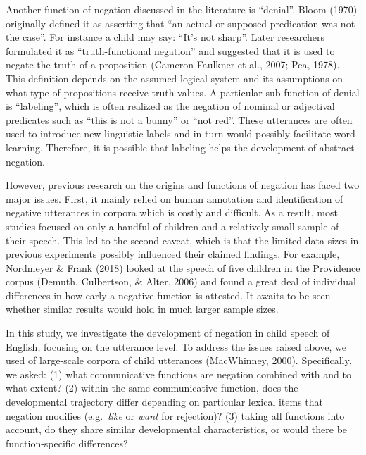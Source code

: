 \documentclass[10pt, letterpaper]{article}
\begin{document}
Another function of negation discussed in the literature is ``denial''.
Bloom (1970) originally defined it as asserting that ``an actual or
supposed predication was not the case''. For instance a child may say:
``It's not sharp''. Later researchers formulated it as
``truth-functional negation'' and suggested that it is used to negate
the truth of a proposition (Cameron-Faulkner et al., 2007; Pea, 1978).
This definition depends on the assumed logical system and its
assumptions on what type of propositions receive truth values. A
particular sub-function of denial is ``labeling'', which is often
realized as the negation of nominal or adjectival predicates such as
``this is not a bunny'' or ``not red''. These utterances are often used
to introduce new linguistic labels and in turn would possibly facilitate
word learning. Therefore, it is possible that labeling helps the
development of abstract negation.

However, previous research on the origins and functions of negation has
faced two major issues. First, it mainly relied on human annotation and
identification of negative utterances in corpora which is costly and
difficult. As a result, most studies focused on only a handful of
children and a relatively small sample of their speech. This led to the
second caveat, which is that the limited data sizes in previous
experiments possibly influenced their claimed findings. For example,
Nordmeyer \& Frank (2018) looked at the speech of five children in the
Providence corpus (Demuth, Culbertson, \& Alter, 2006) and found a great
deal of individual differences in how early a negative function is
attested. It awaits to be seen whether similar results would hold in
much larger sample sizes.

In this study, we investigate the development of negation in child
speech of English, focusing on the utterance level. To address the
issues raised above, we used of large-scale corpora of child utterances
(MacWhinney, 2000). Specifically, we asked: (1) what communicative
functions are negation combined with and to what extent? (2) within the
same communicative function, does the developmental trajectory differ
depending on particular lexical items that negation modifies
(e.g.~\emph{like} or \emph{want} for rejection)? (3) taking all
functions into account, do they share similar developmental
characteristics, or would there be function-specific differences?
\end{document}
